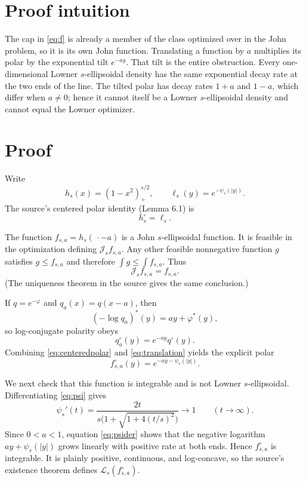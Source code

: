 \documentclass[11pt]{article}
\newcommand{\J}{\mathcal J}
\newcommand{\Lw}{\mathcal L}
\begin{document}
\section{Proof intuition}

The cap in \eqref{eq:f} is already a member of the class optimized over in
the John problem, so it is its own John function.  Translating a function by
$a$ multiplies its polar by the exponential tilt $e^{-ay}$.  That tilt is the
entire obstruction.  Every one-dimensional Lowner $s$-ellipsoidal density has
the same exponential decay rate at the two ends of the line.  The tilted
polar has decay rates $1+a$ and $1-a$, which differ when $a\ne0$; hence it
cannot itself be a Lowner $s$-ellipsoidal density and cannot equal the Lowner
optimizer.

\section{Proof}

Write
\[
 h_s(x)=(1-x^2)_+^{s/2},\qquad
 \ell_s(y)=e^{-\psi_s(|y|)}.
\]
The source's centered polar identity (Lemma 6.1) is
\begin{equation}\label{eq:centeredpolar}
 h_s^\circ=\ell_s.
\end{equation}

The function $f_{s,a}=h_s(\,\cdot-a)$ is a John $s$-ellipsoidal function.
It is feasible in the optimization defining $\J_s f_{s,a}$.  Any other
feasible nonnegative function $g$ satisfies $g\le f_{s,a}$ and therefore
$\int g\le\int f_{s,a}$.  Thus
\begin{equation}\label{eq:johnself}
 \J_s f_{s,a}=f_{s,a}.
\end{equation}
(The uniqueness theorem in the source gives the same conclusion.)

If $q=e^{-\varphi}$ and $q_a(x)=q(x-a)$, then
\[
 (-\log q_a)^*(y)=ay+\varphi^*(y),
\]
so log-conjugate polarity obeys
\begin{equation}\label{eq:translation}
 q_a^\circ(y)=e^{-ay}q^\circ(y).
\end{equation}
Combining \eqref{eq:centeredpolar} and \eqref{eq:translation} yields the
explicit polar
\begin{equation}\label{eq:polar}
 f_{s,a}^\circ(y)=e^{-ay-\psi_s(|y|)}.
\end{equation}

We next check that this function is integrable and is not Lowner
$s$-ellipsoidal.  Differentiating \eqref{eq:psi} gives
\begin{equation}\label{eq:psider}
 \psi_s'(t)=
 \frac{2t}{s\bigl(1+\sqrt{1+4(t/s)^2}\bigr)}
 \longrightarrow 1
 \qquad(t\to\infty).
\end{equation}
Since $0<a<1$, equation \eqref{eq:psider} shows that the negative logarithm
$ay+\psi_s(|y|)$ grows linearly with positive rate at both ends.  Hence
$f_{s,a}^\circ$ is integrable.  It is plainly positive, continuous, and
log-concave, so the source's existence theorem defines $\Lw_s(f_{s,a}^\circ)$.
\end{document}
